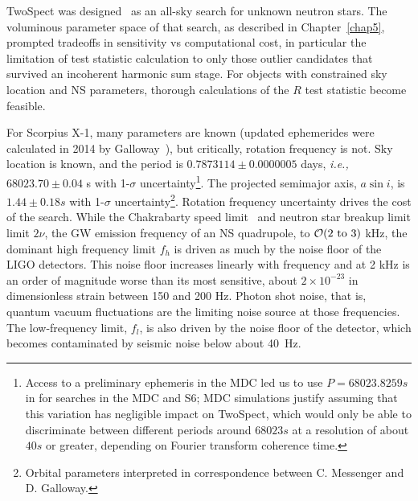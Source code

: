 TwoSpect was designed~\cite{GoetzThesis,GoetzTwoSpectMethods2011} as an all-sky search for unknown neutron stars.
The voluminous parameter space of that search, as described in Chapter~\ref{chap5}, prompted tradeoffs in sensitivity vs computational cost, in particular the limitation of test statistic calculation to only those outlier candidates that survived an incoherent harmonic sum stage. 
For objects with constrained sky location and NS parameters, thorough calculations of the $R$ test statistic become feasible.

For Scorpius X-1, many parameters are known (updated ephemerides were calculated in 2014 by Galloway~\cite{Galloway2014}), but critically, rotation frequency is not.
Sky location is known, and the period is $0.7873114 \pm 0.0000005$ days, \textit{i.e.,} $68023.70 \pm 0.04$ s with 1-$\sigma$ uncertainty\footnote{Access to a preliminary ephemeris in the MDC led us to use $P = 68023.8259 s$ in for searches in the MDC and S6; MDC simulations justify assuming that this variation has negligible impact on TwoSpect, which would only be able to discriminate between different periods around $68023 s$ at a resolution of about $40 s$ or greater, depending on Fourier transform coherence time.}.
The projected semimajor axis, $a \sin i$, is $1.44 \pm 0.18 s$ with 1-$\sigma$ uncertainty\footnote{Orbital parameters interpreted in correspondence between C. Messenger and D. Galloway.}.
Rotation frequency uncertainty drives the cost of the search.
While the Chakrabarty speed limit~\cite{Chakrabarty2003} and neutron star breakup limit limit $2\nu$, the GW emission frequency of an NS quadrupole, to $\mathcal{O}(2\textup{ to }3)$ kHz, the dominant high frequency limit $f_h$ is driven as much by the noise floor of the LIGO detectors.
This noise floor increases linearly with frequency and at 2 kHz is an order of magnitude worse than its most sensitive, about $2\times10^{-23}$ in dimensionless strain between 150 and 200 Hz.
Photon shot noise, that is, quantum vacuum fluctuations are the limiting noise source at those frequencies.
The low-frequency limit, $f_l$, is also driven by the noise floor of the detector, which becomes contaminated by seismic noise below about 40~Hz.

